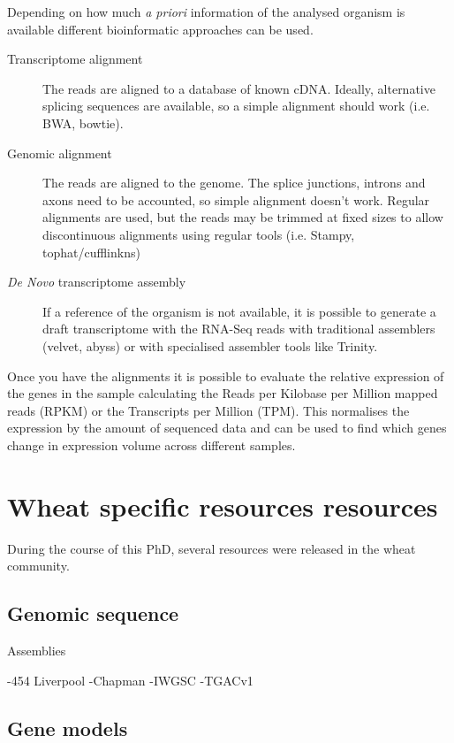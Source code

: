Depending on how much \textit{a priori} information of the analysed organism is available different bioinformatic approaches can be used.
\begin{description}
\item[Transcriptome alignment] The reads are aligned to a database of known cDNA. Ideally, alternative splicing sequences are available, so a simple alignment should work (i.e. BWA, bowtie). 
\item[Genomic alignment] The reads are aligned to the genome. The splice junctions, introns and axons need to be accounted, so simple alignment doesn't work. Regular alignments are used, but the reads may be trimmed at fixed sizes to allow discontinuous alignments using regular tools (i.e. Stampy, tophat/cufflinkns)
\item[\textit{De Novo} transcriptome assembly] If a reference of the organism is not available, it is possible to generate a draft transcriptome with the RNA-Seq reads with traditional assemblers (velvet, abyss) or with specialised assembler tools like Trinity. 
\end{description}

Once you have the alignments it is possible to evaluate the relative expression of the genes in the sample calculating the Reads per Kilobase per Million mapped reads (RPKM) or the Transcripts per Million (TPM). This normalises the expression by the amount of sequenced data and can be used to find which genes change in expression volume across different samples.   


\section{Wheat specific resources resources}
\label{lit:wheatResourcers}

During the course of this PhD, several resources were released in the wheat community. 

\subsection{Genomic sequence}
Assemblies 

-454 Liverpool
-Chapman
-IWGSC
-TGACv1


\subsection{Gene models}


